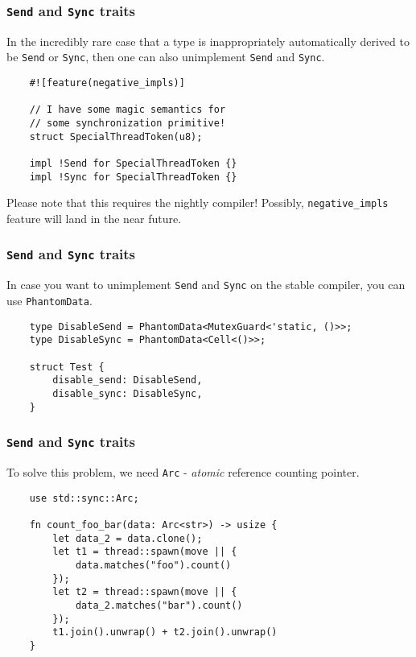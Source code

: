 \documentclass[aspectratio=1610,t]{beamer}
\begin{document}

\begin{frame}[fragile]
\frametitle{\texttt{Send} and \texttt{Sync} traits}
In the incredibly rare case that a type is inappropriately automatically derived to be \texttt{Send} or \texttt{Sync}, then one can also unimplement \texttt{Send} and \texttt{Sync}.

\begin{verbatim}
    #![feature(negative_impls)]

    // I have some magic semantics for
    // some synchronization primitive!
    struct SpecialThreadToken(u8);

    impl !Send for SpecialThreadToken {}
    impl !Sync for SpecialThreadToken {}
\end{verbatim}

Please note that this requires the nightly compiler! Possibly, \texttt{negative\_impls} feature will land in the near future.
\end{frame}


\begin{frame}[fragile]
\frametitle{\texttt{Send} and \texttt{Sync} traits}
In case you want to unimplement \texttt{Send} and \texttt{Sync} on the stable compiler, you can use \texttt{PhantomData}.

\begin{verbatim}
    type DisableSend = PhantomData<MutexGuard<'static, ()>>;
    type DisableSync = PhantomData<Cell<()>>;

    struct Test {
        disable_send: DisableSend,
        disable_sync: DisableSync,
    }
\end{verbatim}
\end{frame}


\begin{frame}[fragile]
\frametitle{\texttt{Send} and \texttt{Sync} traits}
To solve this problem, we need \texttt{Arc} - \textit{atomic} reference counting pointer.

\begin{verbatim}
    use std::sync::Arc;

    fn count_foo_bar(data: Arc<str>) -> usize {
        let data_2 = data.clone();
        let t1 = thread::spawn(move || {
            data.matches("foo").count()
        });
        let t2 = thread::spawn(move || {
            data_2.matches("bar").count()
        });
        t1.join().unwrap() + t2.join().unwrap()
    }
\end{verbatim}
\end{frame}
\end{document}
